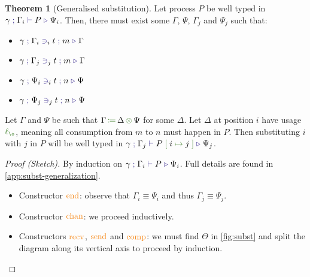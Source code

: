 \documentclass[a4paper,UKenglish,cleveref,autoref,thm-restate,authorcolumns]{lipics-v2019}
\theoremstyle{definition}
\newtheorem{nitheorem}{Theorem}
\newcommand{\type}[1]{\textcolor{BlueViolet}{\operatorname{#1}}}
\newcommand{\constr}[1]{\textcolor{BurntOrange}{\operatorname{#1}}}
\newcommand{\func}[1]{\textcolor{OliveGreen}{\operatorname{#1}}}
\newcommand{\subst}[3]{#1 \; \func{[} \; #3 \; \func{\mapsto} \;#2 \; \func{]}}
\newcommand{\opctx}[3]{#1 \, \func{\coloneqq} \, #2 \, \func{\otimes} \, #3}
\newcommand{\lz}{\func{\ell_{\o}}}
\newcommand{\types}[4]{#1 \; \type{;} \; #2 \; \type{\vdash} \; #3 \; \type{\triangleright} \; #4}
\newcommand{\contains}[6]{#1 \; \type{;} \; #2 \; \type{\ni}_{#3} \; #4 \; \type{;} \; #5 \; \type{\triangleright} \; #6}
\begin{document}
\begin{nitheorem}[Generalised substitution]
  \label{thm:subst-generalization}
  Let process $P$ be well typed in $\types{\gamma}{\Gamma_i}{P}{\Psi_i}$.
  Then, there must exist some $\Gamma$, $\Psi$, $\Gamma_j$ and $\Psi_j$ such that:
  \begin{multicols}{2}
  \begin{itemize}
    \item $\contains{\gamma}{\Gamma_i}{i}{t}{m}{\Gamma}$
    \item $\contains{\gamma}{\Gamma_j}{j}{t}{m}{\Gamma}$
    \item $\contains{\gamma}{\Psi_i}{i}{t}{n}{\Psi}$
    \item $\contains{\gamma}{\Psi_j}{j}{t}{n}{\Psi}$
  \end{itemize}
  \end{multicols}
  Let $\Gamma$ and $\Psi$ be such that $\opctx{\Gamma}{\Delta}{\Psi}$ for some $\Delta$.
  Let $\Delta$ at position $i$ have usage $\lz$, meaning all consumption from $m$ to $n$ must happen in $P$.
  Then substituting $i$ with $j$ in $P$ will be well typed in $\types{\gamma}{\Gamma_j}{\subst{P}{j}{i}}{\Psi_j}$.
\end{nitheorem}

\begin{proof}[Proof (Sketch)]
  By induction on $\types{\gamma}{\Gamma_i}{P}{\Psi_i}$.
  Full details are found in \autoref{app:subst-generalization}.
  \begin{itemize}
   \item
     Constructor $\constr{end}$: observe that $\Gamma_i \equiv \Psi_i$ and thus $\Gamma_j \equiv \Psi_j$.
   \item
     Constructor $\constr{chan}$: we proceed inductively.
   \item
     Constructors $\constr{recv}$, $\constr{send}$ and $\constr{comp}$: we must find $\Theta$ in \autoref{fig:subst} and split the diagram along its vertical axis to proceed by induction. \qedhere
 \end{itemize}
\end{proof}
\end{document}
